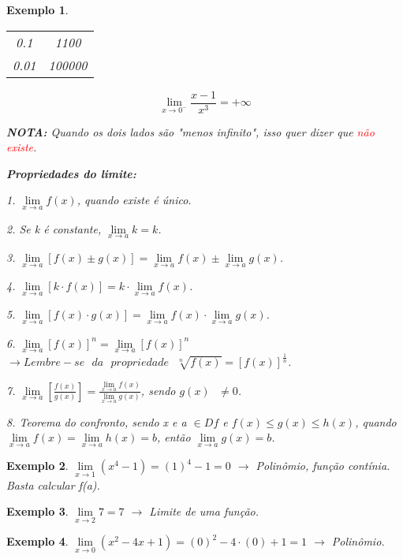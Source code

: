 \documentclass{book}
\numberwithin{defn}{chapter}
\newtheorem{exe}{Exemplo}
\numberwithin{exe}{chapter}
\numberwithin{ex}{chapter}
\numberwithin{obs}{chapter}
\numberwithin{fato}{chapter}
\numberwithin{resp}{chapter}
\begin{document}
\begin{exe}
\begin{longtable}[c]{| c | c |}
\hline
\endfoot

\hline
\multicolumn{2}{| c |}{}\\
\hline\hline
\endlastfoot

0.1 & 1100\\
0.01 & 100000\\
\end{longtable}

\[\lim\limits_{x\to 0^{-}}\frac{x-1}{x^3}=+\infty\]

\textbf{NOTA:} Quando os dois lados são "menos infinito", isso quer dizer que \textcolor{red}{não existe}.

\item\textbf{Propriedades do limite:}
\item 1. $\lim\limits_{x\to a}f(x)$, quando existe é único.
\item 2. Se k é constante, $\lim\limits_{x\to a}k=k$.
\item 3. $\lim\limits_{x\to a}[f(x)\pm g(x)] = \lim\limits_{x\to a}f(x)\pm \lim\limits_{x\to a}g(x)$.
\item 4. $\lim\limits_{x\to a}[k\cdot f(x)] = k\cdot \lim\limits_{x\to a}f(x)$.
\item 5. $\lim\limits_{x\to a}[f(x)\cdot g(x)] = \lim\limits_{x\to a}f(x)\cdot \lim\limits_{x\to a}g(x)$.
\item 6. $\lim\limits_{x\to a}[f(x)]^n = \lim\limits_{x\to a}[f(x)]^n$ $\rightarrow Lembre-se \text{ }da \text{ } propriedade\text{ } \sqrt[n]{f(x)}=[f(x)]^{\frac{1}{n}}$.
\item 7. $\lim\limits_{x\to a}\left[\frac{f(x)}{g(x)}\right] = \frac{\lim\limits_{x\to a}f(x)}{\lim\limits_{x\to a}g(x)}$, sendo $g(x)\text{ }\neq 0$.
\item 8. Teorema do confronto, sendo x e a $\in Df$ e $f(x)\le g(x)\le h(x)$, quando $\lim\limits_{x\to a}f(x) = \lim\limits_{x\to a}h(x) = b$, então $\lim\limits_{x\to a}g(x) = b$.
\end{exe}

\begin{exe}
    $\lim\limits_{x\to 1}(x^4-1) = (1)^4-1=0$ $\rightarrow$ Polinômio, função contínia. Basta calcular f(a).
\end{exe}

\begin{exe}
    $\lim\limits_{x\to 2}7 = 7$ $\rightarrow$ Limite de uma função.
\end{exe}

\begin{exe}
    $\lim\limits_{x\to 0}(x^2-4x+1) = (0)^2-4\cdot(0)+1=1$ $\rightarrow$ Polinômio.
\end{exe}
\end{document}
